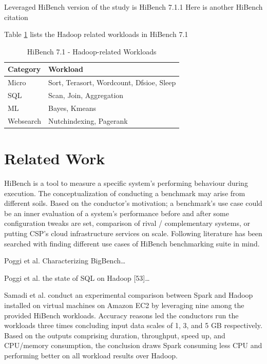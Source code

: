 \documentclass[review]{elsarticle}
\begin{document}
Leveraged HiBench version of the study is HiBench 7.1.1 \cite{noauthor_release_nodate} Here is another HiBench citation \cite{rabl_experience_2014}

Table \ref{tab:hibench-wrkl} lists the Hadoop related workloads in HiBench 7.1



\begin{table}
	\centering
	\small
	\caption{HiBench 7.1 - Hadoop-related Workloads}
	\label{tab:hibench-wrkl}
	\begin{tabular}[h!]{ p{2.0cm} p{6.0cm}  }
		\hline
		\textbf{Category} & \textbf{Workload} \\
		\hline
		Micro & Sort, Terasort, Wordcount, Dfsioe, Sleep \\
		SQL & Scan, Join, Aggregation  \\
		ML & Bayes, Kmeans\\
		Websearch & Nutchindexing, Pagerank\\
		\hline
	\end{tabular}
\end{table}




\section{Related Work}
HiBench is a tool to measure a specific system’s performing behaviour during execution. The conceptualization of conducting a benchmark may arise from different soils. Based on the conductor’s motivation; a benchmark’s use case could be an inner evaluation of a system’s performance before and after some configuration tweaks are set, comparison of rival / complementary systems, or putting CSP’s cloud infrastructure services on scale. Following literature has been searched with finding different use cases of HiBench benchmarking suite in mind. 

Poggi et al. \cite{poggi_characterizing_2018} Characterizing BigBench…

Poggi et al. \cite{poggi_state_2016} the state of SQL on Hadoop [53]…

Samadi et al. \cite{samadi_performance_2018} conduct an experimental comparison between Spark and Hadoop installed on virtual machines on Amazon EC2 by leveraging nine among the provided HiBench workloads. Accuracy reasons led the conductors run the workloads three times concluding input data scales of 1, 3, and 5 GB respectively. Based on the outputs comprising duration, throughput, speed up, and CPU/memory consumption, the conclusion draws Spark consuming less CPU and performing better on all workload results over Hadoop. 
\end{document}
